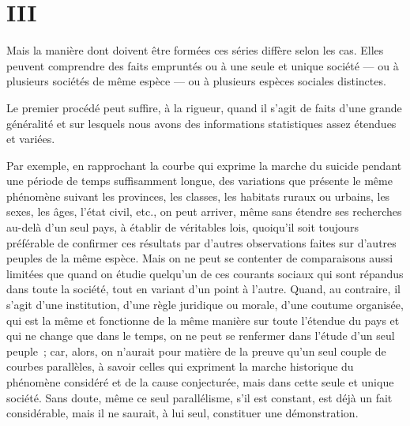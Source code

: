 \documentclass[french,twoside]{book} %
\begin{document}
\section[{III}]{III}
\noindent Mais la manière dont doivent être formées ces séries diffère selon les cas. Elles peuvent comprendre des faits empruntés ou à une seule et unique société — ou à plusieurs sociétés de même espèce — ou à plusieurs espèces sociales distinctes.\par
Le premier procédé peut suffire, à la rigueur, quand il s’agit de faits d’une grande généralité et sur lesquels nous avons des informations statistiques assez étendues et variées.\par
Par exemple, en rapprochant la courbe qui exprime la marche du suicide pendant une période de temps suffisamment longue, des variations que présente le même phénomène suivant les provinces, les classes, les habitats ruraux ou urbains, les sexes, les âges, l’état civil, etc., on peut arriver, même sans étendre ses recherches au-delà d’un seul pays, à établir de véritables lois, quoiqu’il soit toujours préférable de confirmer ces résultats par d’autres observations faites sur d’autres peuples de la même espèce. Mais on ne peut se contenter de comparaisons aussi limitées que quand on étudie quelqu’un de ces courants sociaux qui sont répandus dans toute la société, tout en variant d’un point à l’autre. Quand, au contraire, il s’agit d’une institution, d’une règle juridique ou morale, d’une coutume organisée, qui est la même et fonctionne de la même manière sur toute l’étendue du pays et qui ne change que dans le temps, on ne peut se renfermer dans l’étude d’un seul peuple ; car, alors, on n’aurait pour matière de la preuve qu’un seul couple de courbes parallèles, à savoir celles qui expriment la marche historique du phénomène considéré et de la cause conjecturée, mais dans cette seule et unique société. Sans doute, même ce seul parallélisme, s’il est constant, est déjà un fait considérable, mais il ne saurait, à lui seul, constituer une démonstration.\par
\end{document}
